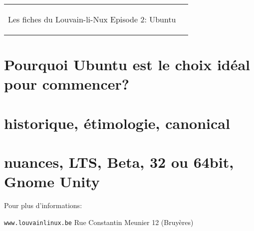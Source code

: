 



\begin{tabular}{p{13cm}r}
    \begin{center}{\Large Les fiches du Louvain-li-Nux\linebreak \linebreak
	\LARGE Episode 2: Ubuntu}\end{center}
		
	\usebox{\logollnux}
\end{tabular}


\section*{Pourquoi Ubuntu est le choix idéal pour commencer?}



\section*{historique, étimologie, canonical}



\section*{nuances, LTS, Beta, 32 ou 64bit, Gnome Unity}



Pour plus d'informations:

\begin{center}\texttt{www.louvainlinux.be} \hspace{0.5cm}Rue Constantin Meunier 12 (Bruyères)\end{center}
                                                                                                                       
		